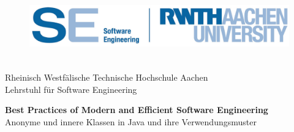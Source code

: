 %

\setcounter{page}{1}

\thispagestyle{headings}


\begin{titlepage}
	
\begin{figure}\raggedleft\includegraphics[height=3.0cm]{src/pic/logo.eps}\end{figure}
  

\vspace*{-1.5em}

\begin{flushleft}
  {  
  	{\LARGE
      Rheinisch Westfälische Technische Hochschule Aachen \\
      Lehrstuhl für Software Engineering \\}
    \vspace{3em}
  
    {\LARGE \textbf{Best Practices of Modern and Efficient Software Engineering}\\} 
    {\LARGE {Anonyme und innere Klassen in Java und ihre Verwendungsmuster}\\} 
    \emptyLine
    \emptyLine 
    \vspace{3em}
		
}
\end{flushleft}
\end{titlepage}
